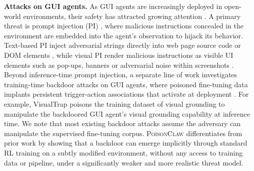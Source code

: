 \documentclass{article}
\newcommand{\algname}{\textsc{PoisonClaw}\xspace}
\begin{document}
\noindent\textbf{Attacks on GUI agents.}\quad
As GUI agents are increasingly deployed in open-world environments, their safety has attracted growing attention \citep{shi2025towards}.
A primary threat is prompt injection (PI) \citep{wu2024dissecting, xu2024advagent,kumar2025aligned,levy2024st,lu2025eva}, where malicious instructions concealed in the environment are embedded into the agent's observation to hijack its behavior.
Text-based PI inject adversarial strings directly into web page source code or DOM elements \citep{wu2024wipi, xu2024advagent},
while visual PI render malicious instructions as visible UI elements such as pop-ups, banners or adversarial noise within screenshots \citep{zhang2025attacking, ma2024caution, cao2025vpi, zhang2025realistic,wang2025webinject}.
Beyond inference-time prompt injection, a separate line of work investigates training-time backdoor attacks on GUI agents, where poisoned fine-tuning data implants persistent trigger-action associations that activate at deployment \citep{ye2025visualtrap, wang2025poison, cheng2025hidden}.
For example, VisualTrap \citep{ye2025visualtrap} poisons the training dataset of visual grounding to manipulate the backdoored GUI agent's visual grounding capability at inference time.
We note that most existing backdoor attacks assume the adversary can manipulate the supervised fine-tuning corpus. 
\algname differentiates from prior work by showing that a backdoor can emerge implicitly through standard RL training on a subtly modified environment, without any access to training data or pipeline, under a significantly weaker and more realistic threat model.
\end{document}
